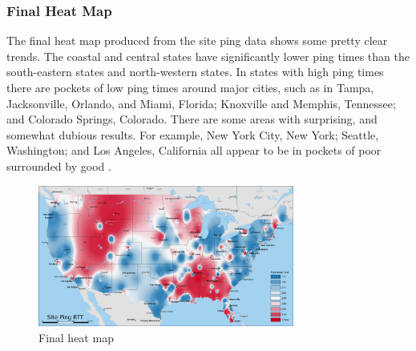 \subsubsection{Final Heat Map}
The final heat map produced from the site ping data shows some pretty clear trends. The coastal and central states have significantly lower ping times than the south-eastern states and north-western states. In states with high ping times there are pockets of low ping times around major cities, such as in  Tampa, Jacksonville, Orlando, and Miami, Florida; Knoxville and Memphis, Tennessee; and Colorado Springs, Colorado. There are some areas with surprising, and somewhat dubious results. For example, New York City, New York; Seattle, Washington; and Los Angeles, California all appear to be in pockets of poor \rtt surrounded by good \rtt.


\begin{figure}[htb]
    \centering
    \includegraphics[width=0.75\textwidth]{images/siteping/site_ping_rtt_idw.png}
    \caption{Final heat map} %
    \label{fig:siteping_heatmap}
\end{figure}
